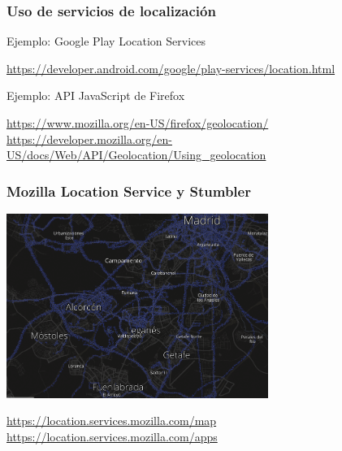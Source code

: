 \begin{frame}
\frametitle{Uso de servicios de localización}

{\Large
Ejemplo: Google Play Location Services \\
}
\begin{flushright}
\url{https://developer.android.com/google/play-services/location.html}
\end{flushright}

{\Large
Ejemplo: API JavaScript de Firefox \\
}

\begin{flushright}
\url{https://www.mozilla.org/en-US/firefox/geolocation/} \\
\url{https://developer.mozilla.org/en-US/docs/Web/API/Geolocation/Using_geolocation}
\end{flushright}
\end{frame}

\begin{frame}
\frametitle{Mozilla Location Service y Stumbler}

\includegraphics[height=6cm]{figs/mozilla-location-map}

\begin{flushright}
  \url{https://location.services.mozilla.com/map} \\
  \url{https://location.services.mozilla.com/apps} \\
\end{flushright}
\end{frame}

